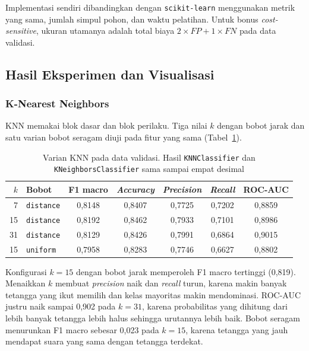 Implementasi sendiri dibandingkan dengan \texttt{scikit-learn} menggunakan
metrik yang sama, jumlah simpul pohon, dan waktu pelatihan. Untuk bonus
\textit{cost-sensitive}, ukuran utamanya adalah total biaya
$2\times FP+1\times FN$ pada data validasi.

\subsection{Hasil Eksperimen dan Visualisasi}

\subsubsection{K-Nearest Neighbors}

KNN memakai blok dasar dan blok perilaku. Tiga nilai $k$ dengan bobot jarak
dan satu varian bobot seragam diuji pada fitur yang sama
(Tabel~\ref{tab:knn}).

\begin{table}[H]
\centering
\small
\caption{Varian KNN pada data validasi. Hasil \texttt{KNNClassifier} dan \texttt{KNeighborsClassifier} sama sampai empat desimal}
\label{tab:knn}

\begin{tabular}{@{}rlccccc@{}}
\toprule
$k$ & Bobot & F1 macro & \textit{Accuracy} & \textit{Precision} & \textit{Recall} & ROC-AUC \\
\midrule
7 & \texttt{distance} & 0,8148 & 0,8407 & 0,7725 & 0,7202 & 0,8859 \\
15 & \texttt{distance} & 0,8192 & 0,8462 & 0,7933 & 0,7101 & 0,8986 \\
31 & \texttt{distance} & 0,8129 & 0,8426 & 0,7991 & 0,6864 & 0,9015 \\
15 & \texttt{uniform} & 0,7958 & 0,8283 & 0,7746 & 0,6627 & 0,8802 \\
\bottomrule
\end{tabular}
\end{table}

Konfigurasi $k=15$ dengan bobot jarak memperoleh F1 macro tertinggi
(0,819). Menaikkan $k$ membuat \textit{precision} naik dan \textit{recall}
turun, karena makin banyak tetangga yang ikut memilih dan kelas mayoritas
makin mendominasi. ROC-AUC justru naik sampai 0,902 pada $k=31$, karena
probabilitas yang dihitung dari lebih banyak tetangga lebih halus sehingga
urutannya lebih baik. Bobot seragam menurunkan F1 macro sebesar 0,023 pada
$k=15$, karena tetangga yang jauh mendapat suara yang sama dengan tetangga
terdekat.

